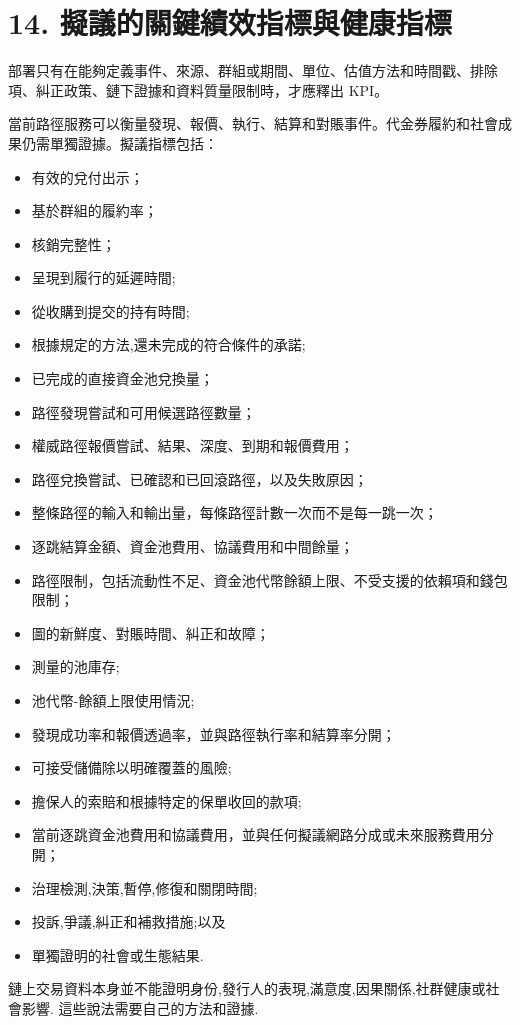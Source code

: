 \documentclass[11pt]{article}
\begin{document}
\section*{14. 擬議的關鍵績效指標與健康指標}

部署只有在能夠定義事件、來源、群組或期間、單位、估值方法和時間戳、排除項、糾正政策、鏈下證據和資料質量限制時，才應釋出 KPI。

當前路徑服務可以衡量發現、報價、執行、結算和對賬事件。代金券履約和社會成果仍需單獨證據。擬議指標包括：

\begin{itemize}[leftmargin=*]
\item 有效的兌付出示；
\item 基於群組的履約率；
\item 核銷完整性；
\item 呈現到履行的延遲時間;
\item 從收購到提交的持有時間;
\item 根據規定的方法,還未完成的符合條件的承諾;
\item 已完成的直接資金池兌換量；
\item 路徑發現嘗試和可用候選路徑數量；
\item 權威路徑報價嘗試、結果、深度、到期和報價費用；
\item 路徑兌換嘗試、已確認和已回滾路徑，以及失敗原因；
\item 整條路徑的輸入和輸出量，每條路徑計數一次而不是每一跳一次；
\item 逐跳結算金額、資金池費用、協議費用和中間餘量；
\item 路徑限制，包括流動性不足、資金池代幣餘額上限、不受支援的依賴項和錢包限制；
\item 圖的新鮮度、對賬時間、糾正和故障；
\item 測量的池庫存;
\item 池代幣-餘額上限使用情況;
\item 發現成功率和報價透過率，並與路徑執行率和結算率分開；
\item 可接受儲備除以明確覆蓋的風險;
\item 擔保人的索賠和根據特定的保單收回的款項;
\item 當前逐跳資金池費用和協議費用，並與任何擬議網路分成或未來服務費用分開；
\item 治理檢測,決策,暫停,修復和關閉時間;
\item 投訴,爭議,糾正和補救措施;以及
\item 單獨證明的社會或生態結果.
\end{itemize}
鏈上交易資料本身並不能證明身份,發行人的表現,滿意度,因果關係,社群健康或社會影響. 這些說法需要自己的方法和證據.
\end{document}
